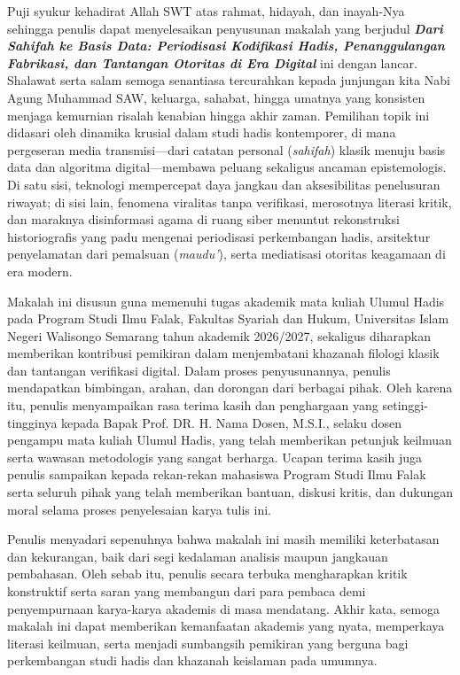 
Puji syukur kehadirat Allah SWT atas rahmat, hidayah, dan inayah-Nya sehingga penulis dapat menyelesaikan penyusunan makalah yang berjudul \textbf{\textit{Dari Sahifah ke Basis Data: Periodisasi Kodifikasi Hadis, Penanggulangan Fabrikasi, dan Tantangan Otoritas di Era Digital}} ini dengan lancar. Shalawat serta salam semoga senantiasa tercurahkan kepada junjungan kita Nabi Agung Muhammad SAW, keluarga, sahabat, hingga umatnya yang konsisten menjaga kemurnian risalah kenabian hingga akhir zaman. Pemilihan topik ini didasari oleh dinamika krusial dalam studi hadis kontemporer, di mana pergeseran media transmisi---dari catatan personal (\textit{sahifah}) klasik menuju basis data dan algoritma digital---membawa peluang sekaligus ancaman epistemologis. Di satu sisi, teknologi mempercepat daya jangkau dan aksesibilitas penelusuran riwayat; di sisi lain, fenomena viralitas tanpa verifikasi, merosotnya literasi kritik, dan maraknya disinformasi agama di ruang siber menuntut rekonstruksi historiografis yang padu mengenai periodisasi perkembangan hadis, arsitektur penyelamatan dari pemalsuan (\textit{maudu'}), serta mediatisasi otoritas keagamaan di era modern.

Makalah ini disusun guna memenuhi tugas akademik mata kuliah Ulumul Hadis pada Program Studi Ilmu Falak, Fakultas Syariah dan Hukum, Universitas Islam Negeri Walisongo Semarang tahun akademik 2026/2027, sekaligus diharapkan memberikan kontribusi pemikiran dalam menjembatani khazanah filologi klasik dan tantangan verifikasi digital. Dalam proses penyusunannya, penulis mendapatkan bimbingan, arahan, dan dorongan dari berbagai pihak. Oleh karena itu, penulis menyampaikan rasa terima kasih dan penghargaan yang setinggi-tingginya kepada Bapak Prof. DR. H. Nama Dosen, M.S.I., selaku dosen pengampu mata kuliah Ulumul Hadis, yang telah memberikan petunjuk keilmuan serta wawasan metodologis yang sangat berharga. Ucapan terima kasih juga penulis sampaikan kepada rekan-rekan mahasiswa Program Studi Ilmu Falak serta seluruh pihak yang telah memberikan bantuan, diskusi kritis, dan dukungan moral selama proses penyelesaian karya tulis ini.

Penulis menyadari sepenuhnya bahwa makalah ini masih memiliki keterbatasan dan kekurangan, baik dari segi kedalaman analisis maupun jangkauan pembahasan. Oleh sebab itu, penulis secara terbuka mengharapkan kritik konstruktif serta saran yang membangun dari para pembaca demi penyempurnaan karya-karya akademis di masa mendatang. Akhir kata, semoga makalah ini dapat memberikan kemanfaatan akademis yang nyata, memperkaya literasi keilmuan, serta menjadi sumbangsih pemikiran yang berguna bagi perkembangan studi hadis dan khazanah keislaman pada umumnya.

